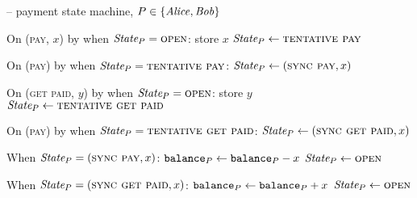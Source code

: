 \begin{center}
  \begin{systembox}{\fchan{} -- payment state machine, $P \in \{\mathit{Alice}, \mathit{Bob}\}$}
    \begin{algorithmic}[1]
      \State On (\textsc{pay}, $x$) by \environment when $\itistate_P =
      \textsc{open}$: 
      \label{code:functionality:pay:when-tent-pay}
      \Indent
        \State store $x$
        \label{code:functionality:pay:store-pay}
        \State $\itistate_P \gets \textsc{tentative pay}$
      \EndIndent
      \Statex

      \State On (\textsc{pay}) by \adversary when $\itistate_P =
      \textsc{tentative pay}$: 
      \label{code:functionality:pay:when-sync-pay}
      \Indent
        \State $\itistate_P \gets (\textsc{sync pay}, x)$
      \EndIndent
      \Statex

      \State On (\textsc{get paid}, $y$) by \environment when $\itistate_P =
      \textsc{open}$: 
      \label{code:functionality:pay:when-tent-get-paid}
      \Indent
        \State store $y$
        \label{code:functionality:pay:store-get-paid}
        \State $\itistate_P \gets \textsc{tentative get paid}$
      \EndIndent
      \Statex

      \State On (\textsc{pay}) by \adversary when $\itistate_P =
      \textsc{tentative get paid}$: 
      \label{code:functionality:pay:when-sync-get-paid}
      \Indent
        \State $\itistate_P \gets (\textsc{sync get paid}, x)$
      \EndIndent
      \Statex

      \State When $\itistate_P = (\textsc{sync pay}, x)$:
      \Indent
          \State $\texttt{balance}_{P} \gets \texttt{balance}_{P} - x$
          \label{code:functionality:pay:decrement}
          \State {}
          \State $\itistate_P \gets \textsc{open}$
          \label{code:functionality:pay:pay-end}
        \EndIf
      \EndIndent
      \Statex

      \State When $\itistate_P = (\textsc{sync get paid}, x)$:
      \Indent
          \State $\texttt{balance}_{P} \gets \texttt{balance}_{P} + x$
          \label{code:functionality:pay:increment}
          \State {}
          \State $\itistate_P \gets \textsc{open}$
          \label{code:functionality:pay:get-paid-end}
        \EndIf
      \EndIndent
    \end{algorithmic}
  \end{systembox}
  \label{code:functionality:pay}
\end{center} \ \\

